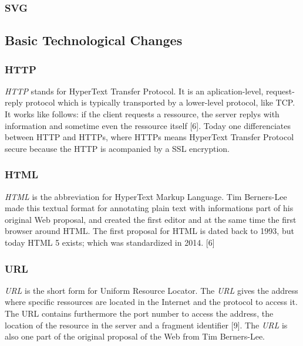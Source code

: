 \documentclass[runningheads]{llncs}
\begin{document}
			\subsubsection{SVG}%
		\subsection{Basic Technological Changes}
			\subsubsection{HTTP}
			\leavevmode\newline
			\textit{HTTP} stands for HyperText Transfer Protocol. It is an aplication-level, request-reply protocol which is typically transported by a lower-level protocol, like TCP. It works like follows: if the client requests a ressource, the server replys with information and sometime even the ressource itself [6]. Today one differenciates between HTTP and HTTPs, where HTTPs means HyperText Transfer Protocol secure because the HTTP is acompanied by a SSL encryption.
			\subsubsection{HTML}
			\leavevmode\newline
			\textit{HTML} is the abbreviation for HyperText Markup Language. Tim Berners-Lee made this textual format for annotating plain text with informations part of his original Web proposal, and created the first editor and at the same time the first browser around HTML. The first proposal for HTML is dated back to 1993, but today HTML 5 exists; which was standardized in 2014. [6]
			\subsubsection{URL}
			\leavevmode\newline
			\textit{URL} is the short form for Uniform Resource Locator. The \textit{URL} gives the address where specific ressources are located in the Internet and the protocol to access it. The URL contains furthermore the port number to access the address, the location of the resource in the server and a fragment identifier [9]. The \textit{URL} is also one part of the original proposal of the Web from Tim Berners-Lee. 
\end{document}
